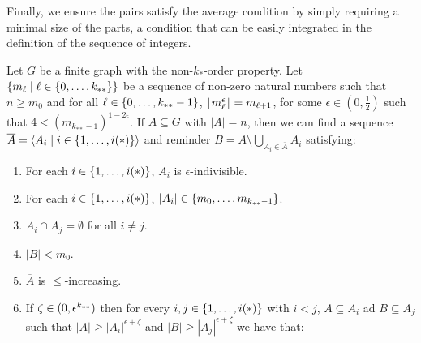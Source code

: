         Finally, we ensure the pairs satisfy the average condition by simply requiring a minimal size of the parts,
        a condition that can be easily integrated in the definition of the sequence of integers.

        \begin{lemma} \label{lem:existance_of_ordered_f_indivisible_partitions_with_exceptions_bound}
            Let $G$ be a finite graph with the non-$k_{*}$-order property.
            Let $\{ m_\ell \mid \ell \in \{ 0, \dots, k_{**} \} \}$ be a sequence of non-zero natural numbers such that
            $n \geq m_0$ and for all $\ell \in \{ 0, \dots, k_{**}-1 \}$, $\left\lfloor m_\ell^\epsilon \right\rfloor = m_{\ell+1}$,
            for some $\epsilon \in (0, \frac{1}{2})$ such that $4 < (m_{k_{**}-1})^{1-2\epsilon}$.
            If $A \subseteq G$ with $|A| = n$, then we can find a sequence $\overline{A} = \left< A_i \mid i \in \{ 1, \dots, i(*) \} \right>$
            and reminder $B = A \setminus \bigcup_{A_i \in \overline{A}} A_i$ satisfying:
            \begin{enumerate}
                \item \label{itm:existance_of_ordered_f_indivisible_partitions_with_exceptions_bound.1} For each $i \in \{ 1, \dots, i(*) \}$, $A_i$ is $\epsilon$-indivisible.
                \item \label{itm:existance_of_ordered_f_indivisible_partitions_with_exceptions_bound.2} For each $i \in \{ 1, \dots, i(*) \}$, $|A_i| \in \{ m_0, \dots, m_{k_{**}-1} \}$.
                \item \label{itm:existance_of_ordered_f_indivisible_partitions_with_exceptions_bound.3} $A_i \cap A_j = \emptyset$ for all $i \neq j$.
                \item \label{itm:existance_of_ordered_f_indivisible_partitions_with_exceptions_bound.4} $|B| < m_0$.
                \item \label{itm:existance_of_ordered_f_indivisible_partitions_with_exceptions_bound.5} $\overline{A}$ is $\leq$-increasing.
                \item \label{itm:existance_of_ordered_f_indivisible_partitions_with_exceptions_bound.6} If $\zeta \in ( 0,\epsilon^{k_{**}} )$ then for every $i,j \in \{ 1, \dots, i(*) \}$ with $i < j$,
                    $A \subseteq A_i$ ad $B \subseteq A_j$ such that $|A| \geq |A_i|^{\epsilon + \zeta}$ and $|B| \geq |A_j|^{\epsilon + \zeta}$
                    we have that:

\end{enumerate}
\end{lemma}
